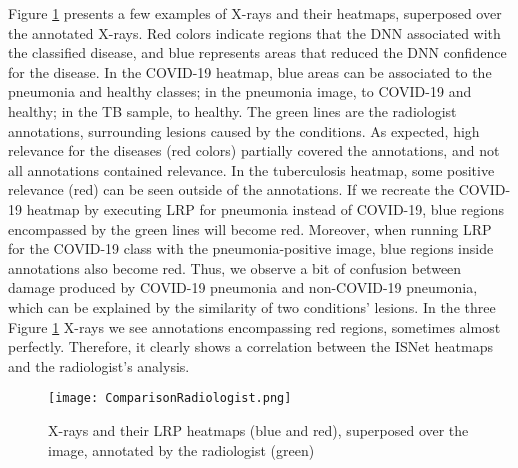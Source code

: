\documentclass[fleqn,10pt]{wlscirep}
\begin{document}
{Figure \ref{rad} presents a few examples of X-rays and their heatmaps, superposed over the annotated X-rays. Red colors indicate regions that the DNN associated with the classified disease, and blue represents areas that reduced the DNN confidence for the disease. In the COVID-19 heatmap, blue areas can be associated to the pneumonia and healthy classes; in the pneumonia image, to COVID-19 and healthy; in the TB sample, to healthy. The green lines are the radiologist annotations, surrounding lesions caused by the conditions. As expected, high relevance for the diseases (red colors) partially covered the annotations, and not all annotations contained relevance. In the tuberculosis heatmap, some positive relevance (red) can be seen outside of the annotations. If we recreate the COVID-19 heatmap by executing LRP for pneumonia instead of COVID-19, blue regions encompassed by the green lines will become red. Moreover, when running LRP for the COVID-19 class with the pneumonia-positive image, blue regions inside annotations also become red. Thus, we observe a bit of confusion between damage produced by COVID-19 pneumonia and non-COVID-19 pneumonia, which can be explained by the similarity of two conditions' lesions. In the three Figure \ref{rad} X-rays we see annotations encompassing red regions, sometimes almost perfectly. Therefore, it clearly shows a correlation between the ISNet heatmaps and the radiologist's analysis.


\begin{figure}[!h]
\texttt{[image: ComparisonRadiologist.png]}
\centering
\caption{X-rays and their LRP heatmaps (blue and red), superposed over the image, annotated by the radiologist (green)}
\label{rad}
\end{figure}

}
\end{document}
